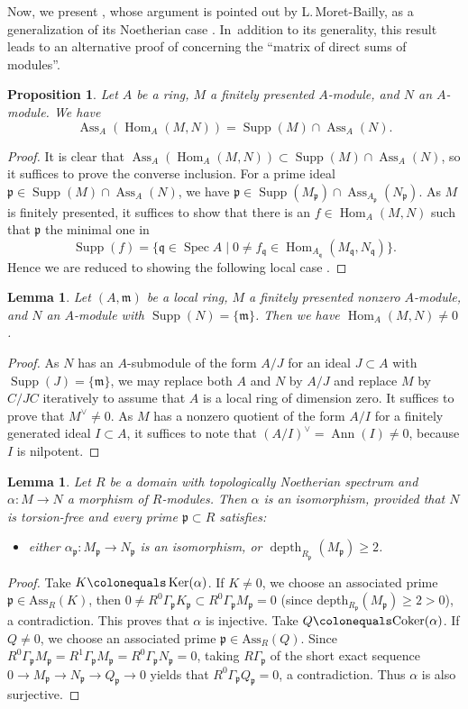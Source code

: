 \documentclass[JEP,XML,SOM,Unicode,published]{cedram}
\let\oldvee\vee
\renewcommand{\vee}{{\scriptscriptstyle\oldvee}}
\newcommand{\GG}{\Gamma}
\newcommand{\fm}{\mathfrak{m}}
\newcommand{\fp}{\mathfrak{p}}
\newcommand{\fq}{\mathfrak{q}}
\let\ce\colonequals
\DeclareMathOperator{\Ker}{Ker}
\DeclareMathOperator{\Spec}{Spec}
\DeclareMathOperator{\Hom}{Hom}
\DeclareMathOperator{\Ann}{Ann}
\DeclareMathOperator{\Ass}{Ass}
\DeclareMathOperator{\depth}{depth}
\DeclareMathOperator{\Supp}{Supp}
\newcommand{\bpf}{\begin{proof}}
\newcommand{\epf}{\end{proof}}
\newcommand{\bprop}{\begin{prop}}
\newcommand{\eprop}{\end{prop}}
\newcommand{\blem}{\begin{lemma}}
\newcommand{\elem}{\end{lemma}}
\theoremstyle{plain}
\newtheorem{lemma}[subsection]{Lemma}
\newtheorem{prop}[subsection]{Proposition}
\theoremstyle{definition}
\begin{document}
Now, we present , whose argument is pointed out by L.\,Moret-Bailly, as a generalization of its Noetherian case \cite[Exp.\,III, Prop.\,1.3]{SGA2new}.
In~addition to its generality, this result leads to an alternative proof of  concerning the ``matrix of direct sums of modules''.
\bprop\label{HomAss}
Let $A$ be a ring, $M$ a finitely presented $A$\nobreakdash-mod\-ule, and $N$ an $A$\nobreakdash-mod\-ule.
We have
\[
\Ass_A(\Hom_A(M,N))=\Supp(M)\cap \Ass_A(N).
\]
\eprop
\bpf
It is clear that $ \Ass_A(\Hom_A(M,N))\subset \Supp(M)\cap \Ass_A(N)$, so it suffices to prove the converse inclusion.
For a prime ideal $\fp\in \Supp(M)\cap \Ass_A(N)$, we have $\fp\in \Supp(M_{\fp})\cap \Ass_{A_{\fp}}(N_{\fp})$.
As $M$ is finitely presented, it suffices to show that there is an $f\in \Hom_A(M,N)$ such that $\fp$ the minimal one in
\[
\Supp(f)=\{\fq\in \Spec A\mid 0\neq f_{\fq}\in \Hom_{A_{\fq}}(M_{\fq},N_{\fq})\}.
\]
Hence we are reduced to showing the following local case .
\epf
\blem\label{HomAss-local}
Let $(A,\fm)$ be a local ring, $M$ a finitely presented nonzero $A$\nobreakdash-mod\-ule, and $N$ an $A$\nobreakdash-mod\-ule with $\Supp(N)=\{\fm\}$.
Then we have $\Hom_A(M,N)\neq 0$.
\elem
\bpf
As $N$ has an $A$-submodule of the form $A/J$ for an ideal $J\subset A$ with $\Supp(J)=\{\fm\}$, we may replace both $A$ and $N$ by $A/J$ and replace $M$ by $C/JC$ iteratively to assume that $A$ is a local ring of dimension zero.
It suffices to prove that $M^{\vee}\neq 0$.
As $M$ has a nonzero quotient of the form $A/I$ for a finitely generated ideal $I\subset A$, it suffices to note that $(A/I)^{\vee}=\Ann(I)\neq 0$, because $I$ is nilpotent.
\epf

\blem\label{lem-iso}
Let $R$ be {a} domain with topologically Noetherian spectrum and $\alpha\colon M\to N$ a morphism of $R$\nobreakdash-mod\-ules.
Then $\alpha$ is an isomorphism, provided that $N$ is torsion-free and every prime $\fp\subset R$ satisfies:
\begin{itemize}
\item
either $\alpha_{\fp}\colon M_{\fp}\to N_{\fp}$ is an isomorphism, or $\depth_{R_{\fp}}(M_{\fp})\geq 2$.
\end{itemize}
\elem
\bpf
Take $K\ce \Ker(\alpha)$. If $K\neq 0$, we choose an associated prime $\fp\in \text{Ass}_{R}(K)$, then $0\neq R^0\GG_{\fp}K_{\fp}\subset R^0\GG_{\fp}M_{\fp}=0$ (since depth$_{R_{\fp}}(M_{\fp})\ge 2>0$), a contradiction. This proves that $\alpha$ is injective.
Take $Q\ce \text{Coker}(\alpha)$. If $Q\neq 0$, we choose an associated prime $\fp\in \text{Ass}_{R}(Q)$. Since $R^0\GG_{\fp}M_{\fp}=R^1\GG_{\fp}M_{\fp}=R^0\GG_{\fp}N_{\fp}=0$, taking $R\GG_{\fp}$ of the short exact sequence
$0\to M_{\fp}\to N_{\fp}\to Q_{\fp}\to 0$ yields that $R^0\GG_{\fp}Q_{\fp}=0$, a contradiction. Thus $\alpha$ is also surjective.
\epf
\end{document}
